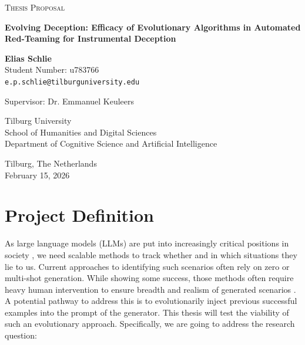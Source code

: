 \documentclass[11pt, a4paper]{article}
\begin{document}
\begin{titlepage}
    \centering
    \vspace*{1cm}

    \Large
    \textsc{Thesis Proposal}

    \vspace{0.5cm}
    
    \Huge
    \textbf{Evolving Deception: Efficacy of Evolutionary Algorithms in Automated Red-Teaming for Instrumental Deception}
    
    \vspace{1.5cm}
    
    \Large
    \textbf{Elias Schlie} \\
    Student Number: u783766 \\
    \texttt{e.p.schlie@tilburguniversity.edu}
    
    \vspace{2cm}
    
    Supervisor: Dr. Emmanuel Keuleers \\
    
    \vfill
    
    \large
    Tilburg University \\
    School of Humanities and Digital Sciences \\
    Department of Cognitive Science and Artificial Intelligence \\
    
    \vspace{2cm}

    Tilburg, The Netherlands \\
    February 15, 2026
    
\end{titlepage}

\newpage

\section{Project Definition}

As large language models (LLMs) are put into increasingly critical positions in society \parencite{bengioInternationalAISafety2025}, we need scalable methods to track whether and in which situations they lie to us.
Current approaches to identifying such scenarios often rely on zero or multi-shot generation.
While showing some success, those methods often require heavy human intervention to ensure breadth and realism of generated scenarios \parencite{renMASKBenchmarkDisentangling2026}. 
A potential pathway to address this is to evolutionarily inject previous successful examples into the prompt of the generator. 
This thesis will test the viability of such an evolutionary approach. 
Specifically, we are going to address the research question: 
\end{document}
